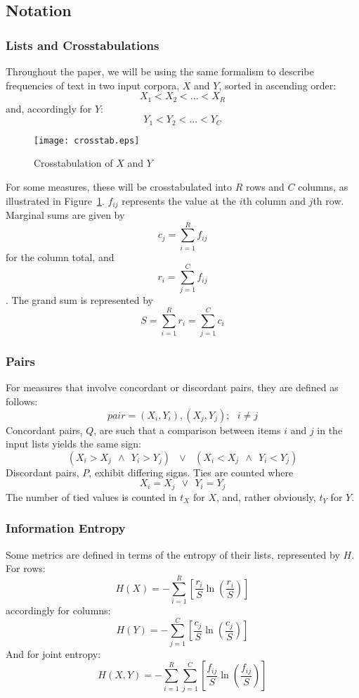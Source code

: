 \documentclass[11pt]{article}
\begin{document}
\subsection{Notation}
\subsubsection{Lists and Crosstabulations}
Throughout the paper, we will be using the same formalism to describe frequencies of text in two input corpora, $X$ and $Y$, sorted in ascending order:
$$
X_1 < X_2 < ... < X_R
$$
and, accordingly for $Y$:
$$
Y_1 < Y_2 < ... < Y_C
$$

\begin{figure}[h]
\centering
  \texttt{[image: crosstab.eps]}%
  \caption{Crosstabulation of $X$ and $Y$}
  \label{fig:crosstab}
\end{figure}

For some measures, these will be crosstabulated into $R$ rows and $C$ columns, as illustrated in Figure~\ref{fig:crosstab}.  $f_{ij}$ represents the value at the $i$th column and $j$th row.  Marginal sums are given by 
$$ c_j = \sum_{i=1}^{R}f_{ij} $$ for the column total, and $$ r_i = \sum_{j=1}^{C}f_{ij} $$.  The grand sum is represented by $$S = \sum_{i=1}^{R}r_i = \sum_{j=1}^{C}c_i $$


\subsubsection{Pairs}
For measures that involve concordant or discordant pairs, they are defined as follows:
$$
pair = (X_i, Y_i), (X_j, Y_j);~~~ i \neq j
$$
Concordant pairs, $Q$, are such that a comparison between items $i$ and $j$ in the input lists yields the same sign:
$$
(X_i > X_j ~~\wedge~~ Y_i > Y_j)
~~~ \vee ~~~
(X_i < X_j ~~\wedge~~ Y_i < Y_j)
$$
Discordant pairs, $P$, exhibit differing signs.  Ties are counted where
$$
X_i = X_j ~~\vee~~ Y_i = Y_j
$$
The number of tied values is counted in $t_X$ for $X$, and, rather obviously, $t_Y$ for $Y$.

\subsubsection{Information Entropy}
Some metrics are defined in terms of the entropy of their lists, represented by $H$.  For rows:
$$
H(X) = -\sum_{i=1}^{R}{ \left[ \frac{ r_i }{ S }       \ln \left( \frac{ r_i }{ S } \right) \right] }
$$
accordingly for columns:
$$
H(Y) = -\sum_{j=1}^{C}{ \left[ \frac{ c_j }{ S }       \ln \left( \frac{ c_j }{ S } \right) \right] }
$$
And for joint entropy:
$$
H(X,Y) = -\sum_{i=1}^{R}{  \sum_{j=1}^{C}{ \left[    \frac{ f_{ij} }{S}  \ln \left( \frac{ f_{ij} }{ S } \right)     \right] } }
$$
\end{document}
